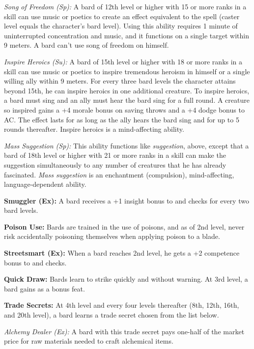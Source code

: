 \textit{Song of Freedom (Sp):} A bard of 12th level or higher with 15 or more ranks in a  skill can use music or poetics to create an effect equivalent to the  spell (caster level equals the character's bard level). Using this ability requires 1 minute of uninterrupted concentration and music, and it functions on a single target within 9 meters. A bard can't use song of freedom on himself.

\textit{Inspire Heroics (Su):} A bard of 15th level or higher with 18 or more ranks in a  skill can use music or poetics to inspire tremendous heroism in himself or a single willing ally within 9 meters. For every three bard levels the character attains beyond 15th, he can inspire heroics in one additional creature. To inspire heroics, a bard must sing and an ally must hear the bard sing for a full round. A creature so inspired gains a +4 morale bonus on saving throws and a +4 dodge bonus to AC. The effect lasts for as long as the ally hears the bard sing and for up to 5 rounds thereafter. Inspire heroics is a mind-affecting ability.

\textit{Mass Suggestion (Sp):} This ability functions like \emph{suggestion}, above, except that a bard of 18th level or higher with 21 or more ranks in a  skill can make the suggestion simultaneously to any number of creatures that he has already fascinated. \emph{Mass suggestion} is an enchantment (compulsion), mind-affecting, language-dependent ability.

\textbf{Smuggler (Ex):} A bard receives a +1 insight bonus to  and  checks for every two bard levels.

\textbf{Poison Use:} Bards are trained in the use of poisons, and as of 2nd level, never risk accidentally poisoning themselves when applying poison to a blade.

\textbf{Streetsmart (Ex):} When a bard reaches 2nd level, he gets a +2 competence bonus to  and  checks.

\textbf{Quick Draw:} Bards learn to strike quickly and without warning. At 3rd level, a bard gains  as a bonus feat.

\textbf{Trade Secrets:} At 4th level and every four levels thereafter (8th, 12th, 16th, and 20th level), a bard learns a trade secret chosen from the list below.

\textit{Alchemy Dealer (Ex):} A bard with this trade secret pays one-half of the market price for raw materials needed to craft alchemical items.

